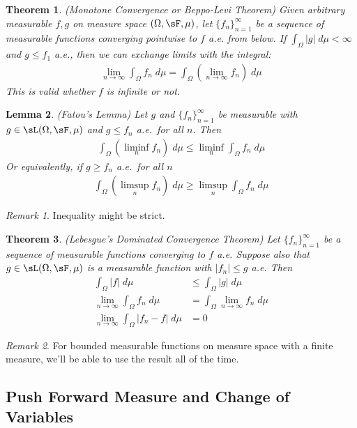 \documentclass[12pt]{article}
\theoremstyle{plain}
\newtheorem{thm}{Theorem}[section]
\newtheorem{lem}[thm]{Lemma}
\theoremstyle{definition}
\theoremstyle{remark}
\newtheorem*{rmk}{Remark}
\newcommand{\ninf}{_{n=1}^\infty}
\newcommand{\limn}{\lim_{n\rightarrow\infty}}
\begin{document}
\begin{thm}\emph{(Monotone Convergence or Beppo-Levi Theorem)}
Given arbitrary measurable $f,g$ on measure space $(\Omega,\sF,\mu)$,
let $\{f_n\}\ninf$ be a sequence of measurable functions converging
pointwise to $f$ a.e. from below. If $\int_\Omega|g|\;d\mu<\infty$ and
$g \leq f_1$ a.e., then we can exchange limits with the integral:
\begin{align*}
    \lim_{n\rightarrow\infty} \int_\Omega f_n \; d\mu =
    \int_\Omega \left(\lim_{n\rightarrow\infty} f_n\right)
    \; d\mu
\end{align*}
This is valid whether $f$ is infinite or not.
\end{thm}

\begin{lem}\emph{(Fatou's Lemma)}
Let $g$ and $\{f_n\}\ninf$ be measurable with $g\in\sL(\Omega,\sF,\mu)$
and $g \leq f_n$ a.e.\ for all $n$. Then
\begin{align*}
  \int_\Omega \left(\liminf_n f_n\right) \; d\mu
  \leq \liminf_n \int_\Omega f_n \; d\mu
\end{align*}
Or equivalently, if $g \geq f_n$ a.e.\ for all $n$
\begin{align*}
  \int_\Omega \left(\limsup_n f_n\right) \; d\mu
  \geq \limsup_n \int_\Omega f_n \; d\mu
\end{align*}
\end{lem}
\begin{rmk}
Inequality might be strict.
\end{rmk}

\begin{thm}\emph{(Lebesgue's Dominated Convergence Theorem)}
Let $\{f_n\}\ninf$ be a sequence of measurable functions converging to $f$
a.e. Suppose also that $g\in\sL(\Omega,\sF,\mu)$ is a measurable
function with $|f_n|\leq g$ a.e. Then
\begin{align*}
  \int_\Omega |f| \;d\mu
  &\leq
  \int_\Omega |g| \;d\mu \\
  \limn \int_\Omega f_n \; d\mu
  &= \int_\Omega \limn f_n \; d\mu \\
  \limn \int_\Omega |f_n-f|\;d\mu &= 0
\end{align*}
\end{thm}
\begin{rmk}
For bounded measurable functions on measure space with a finite measure,
we'll be able to use the result all of the time.
\end{rmk}

\clearpage
\subsection{Push Forward Measure and Change of Variables}
\end{document}
